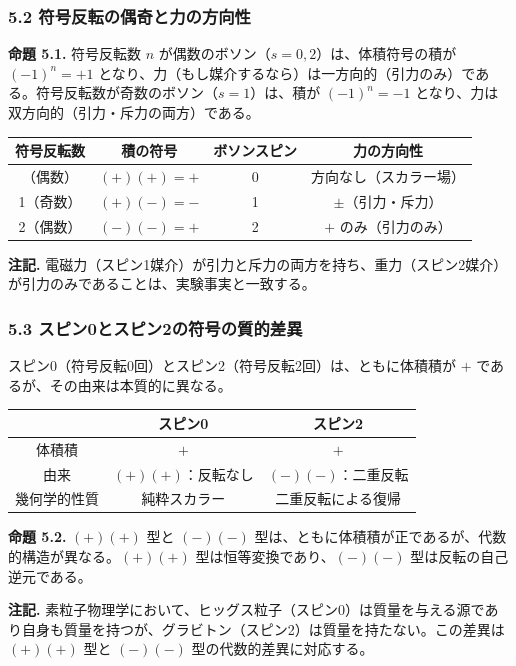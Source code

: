 \documentclass[a4paper,11pt]{ltjsarticle}
\newcounter{none}
\begin{document}
\subsubsection*{5.2 符号反転の偶奇と力の方向性}

\textbf{命題 5.1.} 符号反転数 $n$
が偶数のボソン（$s = 0, 2$）は、体積符号の積が $(-1)^n = +1$
となり、力（もし媒介するなら）は一方向的（引力のみ）である。符号反転数が奇数のボソン（$s = 1$）は、積が
$(-1)^n = -1$ となり、力は双方向的（引力・斥力の両方）である。

{\def\LTcaptype{none}
\begin{longtable}[]{@{}cccc@{}}
\toprule
符号反転数 & 積の符号 & ボソンスピン & 力の方向性 \\
\midrule
\endhead
\bottomrule
\endlastfoot
0（偶数） & $(+)(+) = +$ & 0 & 方向なし（スカラー場） \\
1（奇数） & $(+)(-) = -$ & 1 & $\pm$（引力・斥力） \\
2（偶数） & $(-)(-) = +$ & 2 & $+$ のみ（引力のみ） \\
\end{longtable}
}

\textbf{注記.}
電磁力（スピン1媒介）が引力と斥力の両方を持ち、重力（スピン2媒介）が引力のみであることは、実験事実と一致する。

\subsubsection*{5.3 スピン0とスピン2の符号の質的差異}

スピン0（符号反転0回）とスピン2（符号反転2回）は、ともに体積積が $+$
であるが、その由来は本質的に異なる。

{\def\LTcaptype{none}
\begin{longtable}[]{@{}ccc@{}}
\toprule
& スピン0 & スピン2 \\
\midrule
\endhead
\bottomrule
\endlastfoot
体積積 & $+$ & $+$ \\
由来 & $(+)(+)$：反転なし & $(-)(-) $：二重反転 \\
幾何学的性質 & 純粋スカラー & 二重反転による復帰 \\
\end{longtable}
}

\textbf{命題 5.2.} $(+)(+)$ 型と $(-)(-) $
型は、ともに体積積が正であるが、代数的構造が異なる。$(+)(+)$
型は恒等変換であり、$(-)(-) $ 型は反転の自己逆元である。

\textbf{注記.}
素粒子物理学において、ヒッグス粒子（スピン0）は質量を与える源であり自身も質量を持つが、グラビトン（スピン2）は質量を持たない。この差異は
$(+)(+)$ 型と $(-)(-) $ 型の代数的差異に対応する。
\end{document}
